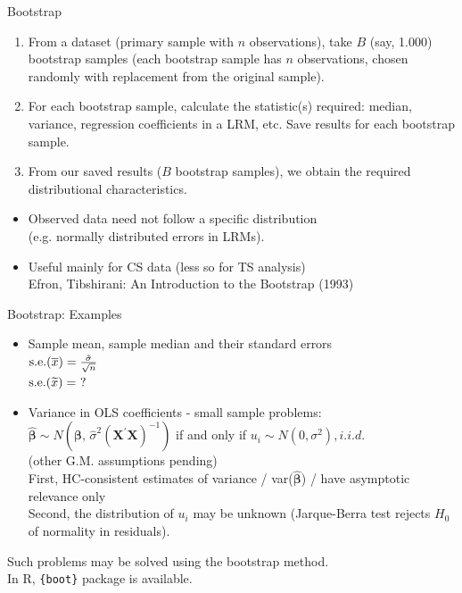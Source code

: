 \documentclass[usenames,dvipsnames]{beamer}
\begin{document}
\begin{frame}{Bootstrap}
\begin{enumerate} 
    \item From a dataset (primary sample with $n$ observations), take $B$ (say, 1.000) bootstrap samples (each bootstrap sample has $n$ observations, chosen randomly with replacement from the original sample).
    \medskip
    \item For each bootstrap sample, calculate the statistic(s) required: median, variance, regression coefficients in a LRM, etc. Save results for each bootstrap sample. 
    \medskip
    \item From our saved results ($B$ bootstrap samples), we obtain the required distributional characteristics.
\end{enumerate}
\begin{itemize} 
    \bigskip
    \item Observed data need not follow a specific distribution \\(e.g. normally distributed errors in LRMs).
    \medskip
    \item Useful mainly for CS data (less so for TS analysis)\\
    Efron, Tibshirani: An Introduction to the Bootstrap (1993)
\end{itemize}
\end{frame}
\begin{frame}{Bootstrap: Examples}
\begin{itemize} 
    \item Sample mean, sample median and their standard errors\\
    \smallskip
    $\textnormal{s.e.}({\overline{x}})=\frac{\hat{\sigma}}{\sqrt{n}}$\\
    $\textnormal{s.e.}({\widetilde{x}})=~?$
    \bigskip
    \item Variance in OLS coefficients - small sample problems:\\
    \medskip
    $\hat{\bm{\beta}} \sim N(\bm{\beta}, \, \hat{\sigma}^2(\bm{X}^{\prime}\bm{X})^{-1})$ if and only if $u_i \sim N(0, \sigma^2), i.i.d.$\\(other G.M. assumptions pending)\\
    \medskip
    First, HC-consistent estimates of variance / var($\hat{\bm{\beta}}$) / have asymptotic relevance only\\
    \medskip
    Second, the distribution of $u_i$ may be unknown (Jarque-Berra test rejects $H_0$ of normality in residuals).
\end{itemize}
\bigskip
Such problems may be solved using the bootstrap method.\\
In R, \texttt{\{boot\}} package is available.
\end{frame}
\end{document}
